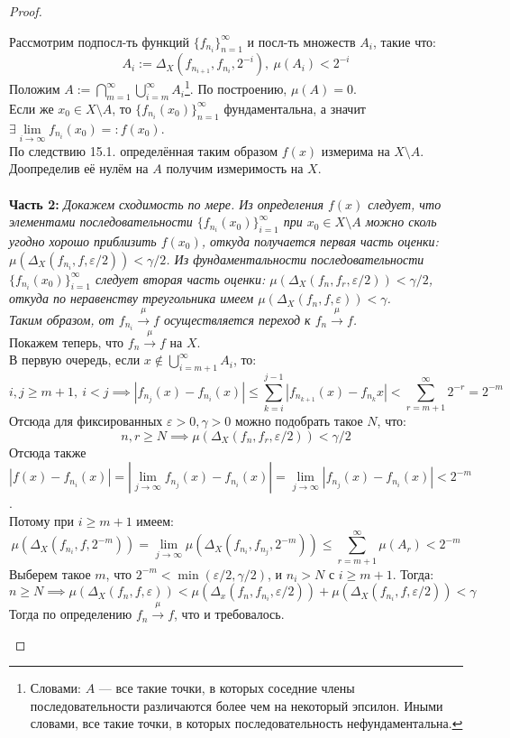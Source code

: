 \documentclass[11pt,a4paper]{report}
\def\eps{\varepsilon}
\theoremstyle{definition}
\theoremstyle{definition}
\theoremstyle{definition}
\begin{document}
\begin{proof}
\begin{itemize}
				Рассмотрим подпосл-ть функций $ \{f_{n_{i}}\}_{n=1}^{\infty} $ и посл-ть множеств $ A_{i} $, такие что: 
				\[ A_{i} := \Delta_{X}(f_{n_{i+1}}, f_{n_{i}}, 2^{-i}),\ \mu(A_{i}) < 2^{-i} \]
				Положим $ A := \bigcap\limits_{m=1}^{\infty}{\bigcup\limits_{i=m}^{\infty}}{A_{i}} $\footnote{Словами: $ A $ — все такие точки, в которых соседние члены последовательности различаются более чем на некоторый эпсилон. Иными словами, все такие точки, в которых последовательность нефундаментальна.}. По построению, $ \mu(A) = 0 $.\\
				Если же $ x_{0} \in X \setminus A $, то $ \{f_{n_{i}}(x_{0})\}_{n=1}^{\infty} $ фундаментальна, а значит $ \exists \lim\limits_{i\to\infty}{f_{n_{i}}(x_{0})} =: f(x_{0}) $.\\
				По следствию 15.1. определённая таким образом $ f(x) $ измерима на $ X \setminus A $.\\ 
				Доопределив её нулём на $ A $ получим измеримость на $ X $.\\\\
				\textbf{Часть 2:} \textit{Докажем сходимость по мере. Из определения $ f(x) $ следует, что элементами последовательности $ \{f_{n_{i}}(x_{0})\}_{i=1}^{\infty} $ при $ x_{0} \in X \setminus A $ можно сколь угодно хорошо приблизить $ f(x_{0}) $, откуда получается первая часть оценки: $ \mu(\Delta_{X}(f_{n_{i}}, f, \eps/2)) < \gamma/2 $. Из фундаментальности последовательности $ \{f_{n_{i}}(x_{0})\}_{i=1}^{\infty} $ следует вторая часть оценки: $ \mu(\Delta_{X}(f_{n}, f_{r}, \eps/2)) < \gamma/2 $, откуда по неравенству треугольника имеем $ \mu(\Delta_{X}(f_{n}, f, \eps)) < \gamma $.\\Таким образом, от $ f_{n_{i}} \xrightarrow{\mu} f $ осуществляется переход к $ f_{n} \xrightarrow{\mu} f $.}\\ 
				
				Покажем теперь, что $ f_{n} \xrightarrow{\mu} f $ на $ X $.\\
				В первую очередь, если $ x \not \in  \bigcup\limits_{i=m+1}^{\infty}{A_{i}} $, то:
				\[ i, j \ge m + 1,\ i < j \implies|f_{n_{j}}(x) - f_{n_{i}}(x)| \le \sum_{k=i}^{j-1}{ |f_{n_{k+1}}(x) - f_{n_{k}} x| } < \sum_{r=m+1}^{\infty}{2^{-r}} = 2^{-m} \]
				Отсюда для фиксированных $ \eps > 0, \gamma > 0 $ можно подобрать такое $ N $, что:
				\[
				n, r \ge N \implies \mu(\Delta_{X}(f_{n}, f_{r}, \eps/2)) < \gamma/2
				\]
				Отсюда также $ |f(x) - f_{n_{i}}(x)| = \left |\lim\limits_{j\to\infty}f_{n_{j}}(x) - f_{n_{i}}(x)\right | = \lim\limits_{j\to\infty}|f_{n_{j}}(x) - f_{n_{i}}(x)| < 2^{-m} $.\\ 
				Потому при $ i \ge m + 1 $ имеем:
				\[
					\mu(\Delta_{X}(f_{n_{i}}, f, 2^{-m})) = \lim_{j\to\infty}\mu(\Delta_{X}(f_{n_{i}}, f_{n_{j}}, 2^{-m})) \le \sum\limits_{r=m+1}^{\infty}{\mu(A_{r})} < 2^{-m}
				\]
				Выберем такое $ m $, что $ 2^{-m} < \min(\eps/2, \gamma/2) $, и $ n_{i} > N $ с $ i \ge m+1 $. Тогда:
				\[
					n \ge N \implies \mu(\Delta_{X}(f_{n}, f, \eps)) < \mu(\Delta_{x}(f_{n}, f_{n_{i}}, \eps/2)) + \mu(\Delta_{X}(f_{n_{i}}, f, \eps/2)) < \gamma
				\]
				Тогда по определению $ f_{n} \xrightarrow{\mu} f $, что и требовалось.
			\end{itemize}
		\end{proof}
\end{document}
